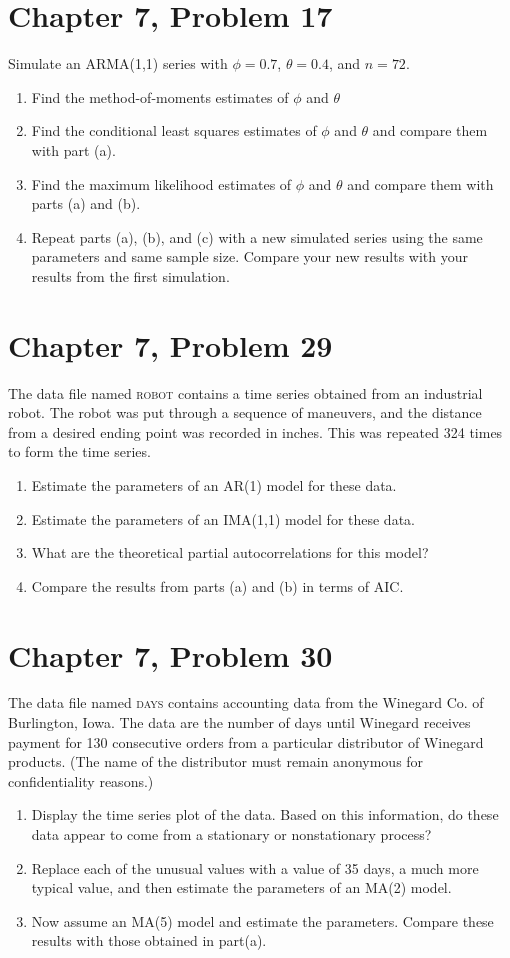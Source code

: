 \documentclass[11pt]{article}
\newif\ifclearpage
\newcommand{\problem}[1]{\section*{#1}}
\newcommand{\solution}{\hrulefill}
\newcommand{\maybeclearpage}{\ifclearpage\clearpage\fi}
\begin{document}
\problem{Chapter 7, Problem 17}
Simulate an ARMA(1,1) series with $\phi = 0.7$, $\theta = 0.4$, and $n = 72$.
\begin{enumerate}
\item Find the method-of-moments estimates of $\phi$ and $\theta$
\item Find the conditional least squares estimates of $\phi$ and $\theta$ and compare them with part (a).
\item Find the maximum likelihood estimates of $\phi$ and $\theta$ and compare them with parts (a) and (b).
\item Repeat parts (a), (b), and (c) with a new simulated series using the same parameters and same sample size. Compare your new results with your results from the first simulation.
\end{enumerate}

\solution


\maybeclearpage
\problem{Chapter 7, Problem 29}
The data file named \textsc{robot} contains a time series obtained from an industrial robot. The robot was put through a sequence of maneuvers, and the distance from a desired ending point was recorded in inches. This was repeated 324 times to form the time series. 
\begin{enumerate}
\item Estimate the parameters of an AR(1) model for these data. 
\item Estimate the parameters of an IMA(1,1) model for these data. 
\item What are the theoretical partial autocorrelations for this model?
\item Compare the results from parts (a) and (b) in  terms of AIC.
\end{enumerate}

\solution


\maybeclearpage
\problem{Chapter 7, Problem 30}
The data file named \textsc{days} contains accounting data from the Winegard Co. of Burlington, Iowa. The data are the number of days until Winegard receives payment for 130 consecutive orders from a particular distributor of Winegard products. (The name of the distributor must remain anonymous for confidentiality reasons.)
\begin{enumerate}
\item Display the time series plot of the data. Based on this information, do these data appear to come from a stationary or nonstationary process?
\item Replace each of the unusual values with a value of 35 days, a much more typical value, and then estimate the parameters of an MA(2) model.
\item Now assume an MA(5) model and estimate the parameters. Compare these results with those obtained in part(a). 
\end{enumerate}
\end{document}
